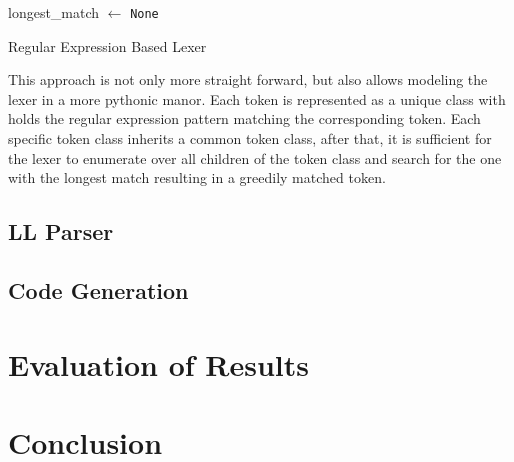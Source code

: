 \begingroup
\vspace{1.5em}
\begin{algorithm}[H]
\setlength{\algomargin}{1.5em}
longest\_match $\gets$ \texttt{None}\\


    


\caption{Regular Expression Based Lexer}
\label{alg:lexer-expression-based}
\end{algorithm}
\vspace{1.5em}
\endgroup

This approach is not only more straight forward, but also allows modeling the lexer in a more pythonic manor. Each token is represented as a unique class with holds the regular expression pattern matching the corresponding token. Each specific token class inherits a common token class, after that, it is sufficient for the lexer to enumerate over all children of the token class and search for the one with the longest match resulting in a greedily matched token.


\section{LL Parser}
\section{Code Generation}
\todo{}



\chapter{Evaluation of Results}
\chapter{Conclusion}





% 
